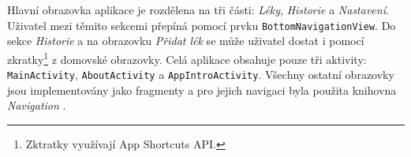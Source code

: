 \documentclass[../TakeYourPill.tex]{subfiles}
\begin{document}
Hlavní obrazovka aplikace je rozdělena na tři části: \textit{Léky}, \textit{Historie} a \textit{Nastavení}. Uživatel mezi těmito sekcemi přepíná pomocí prvku \texttt{BottomNavigationView}. Do sekce \textit{Historie} a na obrazovku \textit{Přidat lék} se může uživatel dostat i pomocí zkratky\footnote{Zktratky využívají App Shortcuts API.} z domovské obrazovky. Celá aplikace obsahuje pouze tři aktivity: \texttt{MainActivity}, \texttt{AboutActivity} a \texttt{AppIntroActivity}. Všechny ostatní obrazovky jsou implementovány jako fragmenty a pro jejich navigaci byla použita knihovna \textit{Navigation} \cite{navigation}.
\end{document}
